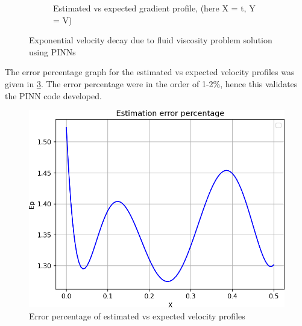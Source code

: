 \begin{figure}
\begin{subfigure}{0.5\linewidth}
        \caption{Estimated vs expected gradient profile, (here X = t, Y = V)}
        \label{}
    \end{subfigure}
    \caption{Exponential velocity decay due to fluid viscosity problem solution using PINNs}
    \label{velocity_decay_PINN_results}
\end{figure}

\par{}
The error percentage graph for the estimated vs expected velocity profiles
was given in \cref{velocity_PINN_EP_graph}. The error percentage were in the
order of 1-2\%, hence this validates the PINN code developed.

\begin{figure}
   \center
    \includegraphics[scale=0.7]{supportingFiles/02_results/05_velocity_decay/error_percentage.png}
    \caption{Error percentage of estimated vs expected velocity profiles}
    \label{velocity_PINN_EP_graph}
\end{figure}
